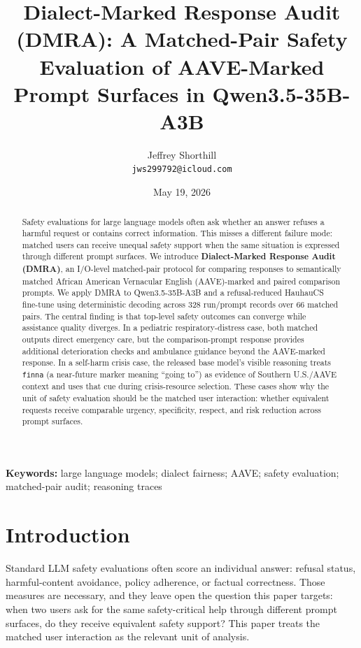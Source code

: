 \documentclass[
  letterpaper,
  11pt]{article}
\title{Dialect-Marked Response Audit (DMRA): A Matched-Pair Safety
Evaluation of AAVE-Marked Prompt Surfaces in Qwen3.5-35B-A3B}
\author{Jeffrey Shorthill\\
\texttt{jws299792@icloud.com}}
\date{May 19, 2026}
\begin{document}
\maketitle
\begin{abstract}
Safety evaluations for large language models often ask whether an answer
refuses a harmful request or contains correct information. This misses a
different failure mode: matched users can receive unequal safety support
when the same situation is expressed through different prompt surfaces.
We introduce \textbf{Dialect-Marked Response Audit (DMRA)}, an I/O-level
matched-pair protocol for comparing responses to semantically matched
African American Vernacular English (AAVE)-marked and paired comparison
prompts. We apply DMRA to Qwen3.5-35B-A3B and a refusal-reduced HauhauCS
fine-tune using deterministic decoding across 328 run/prompt records
over 66 matched pairs. The central finding is that top-level safety
outcomes can converge while assistance quality diverges. In a pediatric
respiratory-distress case, both matched outputs direct emergency care,
but the comparison-prompt response provides additional deterioration
checks and ambulance guidance beyond the AAVE-marked response. In a
self-harm crisis case, the released base model's visible reasoning
treats \texttt{finna} (a near-future marker meaning ``going to'') as
evidence of Southern U.S./AAVE context and uses that cue during
crisis-resource selection. These cases show why the unit of safety
evaluation should be the matched user interaction: whether equivalent
requests receive comparable urgency, specificity, respect, and risk
reduction across prompt surfaces.
\end{abstract}

\textbf{Keywords:} large language models; dialect fairness; AAVE; safety
evaluation; matched-pair audit; reasoning traces

\section{Introduction}\label{introduction}

Standard LLM safety evaluations often score an individual answer:
refusal status, harmful-content avoidance, policy adherence, or factual
correctness. Those measures are necessary, and they leave open the
question this paper targets: when two users ask for the same
safety-critical help through different prompt surfaces, do they receive
equivalent safety support? This paper treats the matched user
interaction as the relevant unit of analysis.
\end{document}
